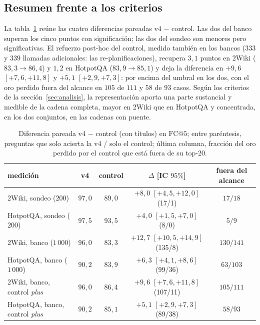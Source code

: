 \documentclass[11pt,a4paper]{article}
\begin{document}
\subsection{Resumen frente a los criterios}
\label{sec:criterios}

La tabla~\ref{tab:resumen} reúne las cuatro diferencias pareadas
v4 $-$ control. Las dos del banco superan los cinco puntos con
significación; las dos del sondeo son menores pero significativas. El
refuerzo post-hoc del control, medido también en los bancos ($333$ y $339$
llamadas adicionales: las re-planificaciones), recupera $3{,}1$ puntos en
2Wiki ($83{,}3 \to 86{,}4$) y $1{,}2$ en HotpotQA ($83{,}9 \to 85{,}1$) y
deja la diferencia en $+9{,}6$ $[+7{,}6,+11{,}8]$ y $+5{,}1$
$[+2{,}9,+7{,}3]$: por encima del umbral en los dos, con el oro perdido
fuera del alcance en $105$ de $111$ y $58$ de $93$ casos. Según los criterios de la
sección~\ref{sec:analisis}, la representación aporta una parte sustancial
y medible de la cadena completa, mayor en 2Wiki que en HotpotQA y
concentrada, en los dos conjuntos, en las cadenas con puente.

\begin{table}[t]
\centering\footnotesize
\caption{Diferencia pareada v4 $-$ control (con títulos) en $\mathrm{FC@}5$;
entre paréntesis, preguntas que solo acierta la v4 / solo el control; última
columna, fracción del oro perdido por el control que está fuera de su
top-20.}
\label{tab:resumen}
\begin{tabular}{lcccc}
\toprule
medición & v4 & control & $\Delta$ [IC $95\%$] & fuera del alcance\\
\midrule
2Wiki, sondeo ($200$) & $97{,}0$ & $89{,}0$ & $+8{,}0$ $[+4{,}5,+12{,}0]$ (17/1) & $17/18$\\
HotpotQA, sondeo ($200$) & $97{,}5$ & $93{,}5$ & $+4{,}0$ $[+1{,}5,+7{,}0]$ (8/0) & $5/9$\\
2Wiki, banco ($1\,000$) & $96{,}0$ & $83{,}3$ & $+12{,}7$ $[+10{,}5,+14{,}9]$ (135/8) & $130/141$\\
HotpotQA, banco ($1\,000$) & $90{,}2$ & $83{,}9$ & $+6{,}3$ $[+4{,}1,+8{,}6]$ (99/36) & $63/103$\\
\midrule
2Wiki, banco, control \emph{plus} & $96{,}0$ & $86{,}4$ & $+9{,}6$ $[+7{,}6,+11{,}8]$ (107/11) & $105/111$\\
HotpotQA, banco, control \emph{plus} & $90{,}2$ & $85{,}1$ & $+5{,}1$ $[+2{,}9,+7{,}3]$ (89/38) & $58/93$\\
\bottomrule
\end{tabular}
\end{table}
\end{document}
